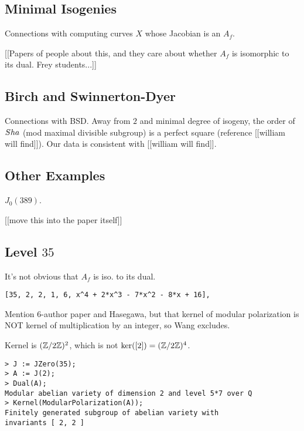 \documentclass{article}
\begin{document}
\subsection{Minimal Isogenies}

Connections with computing curves $X$ whose Jacobian is an $A_f$.

[[Papers of people about this, and they care about whether $A_f$
is isomorphic to its dual.  Frey students...]]

\subsection{Birch and Swinnerton-Dyer}
Connections with BSD.  Away from $2$ and minimal degree of isogeny,
the order of $Sha$ (mod maximal divisible subgroup) is a perfect
square (reference [[william will find]]).  Our data is consistent
with [[william will find]].


\subsection{Other Examples}
$J_0(389)$.

[[move this into the paper itself]]

\subsection{Level $35$}
It's not obvious that $A_f$ is iso. to its dual.
\begin{verbatim}
[35, 2, 2, 1, 6, x^4 + 2*x^3 - 7*x^2 - 8*x + 16],
\end{verbatim}

Mention 6-author paper and Hasegawa, but that kernel of modular
polarization is NOT kernel of multiplication by an integer,
so Wang excludes.

Kernel is $(\mathbb{Z}/2\mathbb{Z})^2$, which is not $\ker([2])=(\mathbb{Z}/2\mathbb{Z})^4$.

\begin{verbatim}
> J := JZero(35);
> A := J(2);
> Dual(A);
Modular abelian variety of dimension 2 and level 5*7 over Q
> Kernel(ModularPolarization(A));
Finitely generated subgroup of abelian variety with
invariants [ 2, 2 ]
\end{verbatim}
\end{document}
